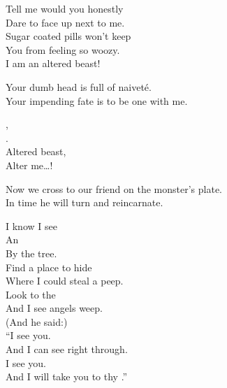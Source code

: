 Tell me would you honestly \\
Dare to face up next to me. \\
Sugar coated pills won't keep \\
You from feeling so woozy. \\

I am an altered beast! \\





Your dumb  head is full of naiveté. \\
Your impending fate is to be one with me. \\


, \\
. \\
Altered beast, \\
Alter me…! \\


Now we cross to our friend on the monster's plate. \\
In time he will turn and reincarnate. \\





I know I see \\
An  \\
By the tree. \\

Find a place to hide \\
Where I could steal a peep. \\
Look to the  \\
And I see angels weep. \\

(And he said:) \\
``I see you. \\
And I can see right through. \\
I see you. \\
And I will take you to thy .'' \\

